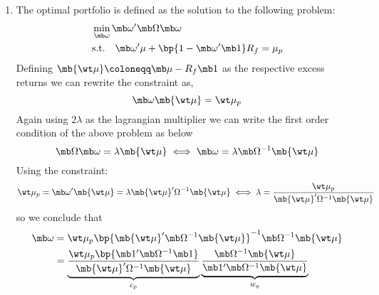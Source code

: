 \begin{solution}
\begin{enumerate}
    \item The optimal portfolio is defined as the solution to the following problem:
    \begin{align*}
        & \min_{\mb \omega} \mb\omega^\prime \mb\Omega \mb \omega \\
        & \text{s.t.} \quad \mb\omega^\prime \mu + \bp{1-\mb\omega^\prime\mb 1}R_f = \mu_p \\
    \end{align*}
    Defining \(\mb{\wt\mu} \coloneqq \mb \mu - R_f\mb 1\) as the respective excess returns we can rewrite the constraint as,
    \[
        \mb\omega\mb{\wt\mu} = \wt\mu_p
    \]
    Again using \(2\lambda\) as the lagrangian multiplier we can write the first order condition of the above problem as below
    \[
        \mb\Omega\mb\omega = \lambda \mb{\wt\mu} \iff \mb \omega = \lambda \mb\Omega^{-1}\mb{\wt\mu}
    \]
    Using the constraint:
    \[
        \wt\mu_p = \mb\omega^\prime\mb{\wt\mu} = \lambda\mb{\wt\mu}^\prime\Omega^{-1}\mb{\wt\mu} \iff \lambda = \frac{\wt\mu_p}{\mb{\wt\mu}^\prime\Omega^{-1}\mb{\wt\mu}}
    \]
    so we conclude that
    \begin{align*}
        \mb\omega & = \wt\mu_p \bp{\mb{\wt\mu}^\prime\mb\Omega^{-1}\mb{\wt\mu}}^{-1}\mb\Omega^{-1}\mb{\wt\mu} \\
        & = \underbrace{\frac{\wt\mu_p\bp{\mb 1^\prime\mb \Omega^{-1}\mb 1}}{\mb{\wt\mu}^\prime\Omega^{-1}\mb{\wt\mu}}}_{c_p} \underbrace{\frac{\mb\Omega^{-1}\mb{\wt\mu}}{\mb 1^\prime \mb\Omega^{-1}\mb{\wt\mu}}}_{w_q}
    \end{align*}
\end{enumerate}
\end{solution}